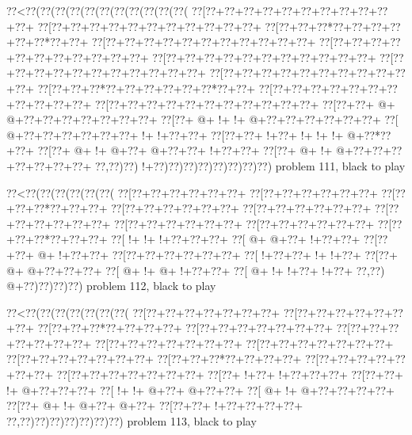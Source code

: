 \vbox{\vbox{\goo
\0??<\0??(\0??(\0??(\0??(\0??(\0??(\0??(\0??(\0??(\0??(\0??(
\0??[\0??+\0??+\0??+\0??+\0??+\0??+\0??+\0??+\0??+\0??+\0??+
\0??[\0??+\0??+\0??+\0??+\0??+\0??+\0??+\0??+\0??+\0??+\0??+
\0??[\0??+\0??+\0??*\0??+\0??+\0??+\0??+\0??+\0??*\0??+\0??+
\0??[\0??+\0??+\0??+\0??+\0??+\0??+\0??+\0??+\0??+\0??+\0??+
\0??[\0??+\0??+\0??+\0??+\0??+\0??+\0??+\0??+\0??+\0??+\0??+
\0??[\0??+\0??+\0??+\0??+\0??+\0??+\0??+\0??+\0??+\0??+\0??+
\0??[\0??+\0??+\0??+\0??+\0??+\0??+\0??+\0??+\0??+\0??+\0??+
\0??[\0??+\0??+\0??+\0??+\0??+\0??+\0??+\0??+\0??+\0??+\0??+
\0??[\0??+\0??+\0??*\0??+\0??+\0??+\0??+\0??+\0??*\0??+\0??+
\0??[\0??+\0??+\0??+\0??+\0??+\0??+\0??+\0??+\0??+\0??+\0??+
\0??[\0??+\0??+\0??+\0??+\0??+\0??+\0??+\0??+\0??+\0??+\0??+
\0??[\0??+\0??+\- @+\- @+\0??+\0??+\0??+\0??+\0??+\0??+\0??+
\0??[\0??+\- @+\- !+\- !+\- @+\0??+\0??+\0??+\0??+\0??+\0??+
\0??[\- @+\0??+\0??+\0??+\0??+\0??+\0??+\- !+\- !+\0??+\0??+
\0??[\0??+\0??+\- !+\0??+\- !+\- !+\- !+\- @+\0??*\0??+\0??+
\0??[\0??+\- @+\- !+\- @+\0??+\- @+\0??+\0??+\- !+\0??+\0??+
\0??[\0??+\- @+\- !+\- @+\0??+\0??+\0??+\0??+\0??+\0??+\0??+
\0??,\0??)\0??)\- !+\0??)\0??)\0??)\0??)\0??)\0??)\0??)\0??)
}
\hfil problem 111, black to play\hfil\break
}

\vbox{\vbox{\goo
\0??<\0??(\0??(\0??(\0??(\0??(\0??(
\0??[\0??+\0??+\0??+\0??+\0??+\0??+
\0??[\0??+\0??+\0??+\0??+\0??+\0??+
\0??[\0??+\0??+\0??*\0??+\0??+\0??+
\0??[\0??+\0??+\0??+\0??+\0??+\0??+
\0??[\0??+\0??+\0??+\0??+\0??+\0??+
\0??[\0??+\0??+\0??+\0??+\0??+\0??+
\0??[\0??+\0??+\0??+\0??+\0??+\0??+
\0??[\0??+\0??+\0??+\0??+\0??+\0??+
\0??[\0??+\0??+\0??*\0??+\0??+\0??+
\0??[\- !+\- !+\- !+\0??+\0??+\0??+
\0??[\- @+\- @+\0??+\- !+\0??+\0??+
\0??[\0??+\0??+\- @+\- !+\0??+\0??+
\0??[\0??+\0??+\0??+\0??+\0??+\0??+
\0??[\- !+\0??+\0??+\- !+\- !+\0??+
\0??[\0??+\- @+\- @+\0??+\0??+\0??+
\0??[\- @+\- !+\- @+\- !+\0??+\0??+
\0??[\- @+\- !+\- !+\0??+\- !+\0??+
\0??,\0??)\- @+\0??)\0??)\0??)\0??)
}
\hfil problem 112, black to play\hfil\break
}

\vbox{\vbox{\goo
\0??<\0??(\0??(\0??(\0??(\0??(\0??(\0??(
\0??[\0??+\0??+\0??+\0??+\0??+\0??+\0??+
\0??[\0??+\0??+\0??+\0??+\0??+\0??+\0??+
\0??[\0??+\0??+\0??*\0??+\0??+\0??+\0??+
\0??[\0??+\0??+\0??+\0??+\0??+\0??+\0??+
\0??[\0??+\0??+\0??+\0??+\0??+\0??+\0??+
\0??[\0??+\0??+\0??+\0??+\0??+\0??+\0??+
\0??[\0??+\0??+\0??+\0??+\0??+\0??+\0??+
\0??[\0??+\0??+\0??+\0??+\0??+\0??+\0??+
\0??[\0??+\0??+\0??*\0??+\0??+\0??+\0??+
\0??[\0??+\0??+\0??+\0??+\0??+\0??+\0??+
\0??[\0??+\0??+\0??+\0??+\0??+\0??+\0??+
\0??[\0??+\- !+\0??+\- !+\0??+\0??+\0??+
\0??[\0??+\0??+\- !+\- @+\0??+\0??+\0??+
\0??[\- !+\- !+\- @+\0??+\- @+\0??+\0??+
\0??[\- @+\- !+\- @+\0??+\0??+\0??+\0??+
\0??[\0??+\- @+\- !+\- @+\0??+\- @+\0??+
\0??[\0??+\0??+\- !+\0??+\0??+\0??+\0??+
\0??,\0??)\0??)\0??)\0??)\0??)\0??)\0??)
}
\hfil problem 113, black to play\hfil\break
}

